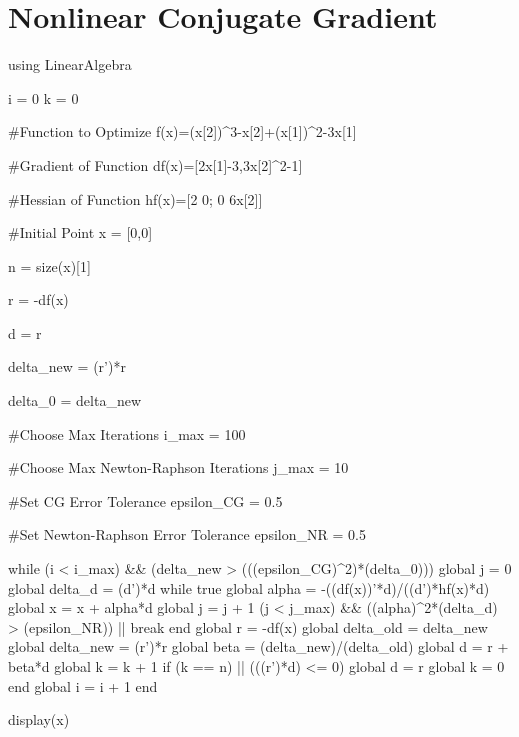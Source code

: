\section{Nonlinear Conjugate Gradient}
\begin{jllisting}
using LinearAlgebra

i = 0
k = 0

#Function to Optimize
f(x)=(x[2])^3-x[2]+(x[1])^2-3x[1]

#Gradient of Function
df(x)=[2x[1]-3,3x[2]^2-1]

#Hessian of Function
hf(x)=[2 0; 0 6x[2]]

#Initial Point
x = [0,0]

n = size(x)[1]

r = -df(x)

d = r

delta_new = (r')*r

delta_0 = delta_new

#Choose Max Iterations
i_max = 100

#Choose Max Newton-Raphson Iterations
j_max = 10

#Set CG Error Tolerance
epsilon_CG = 0.5

#Set Newton-Raphson Error Tolerance
epsilon_NR = 0.5

while (i < i_max) && (delta_new > (((epsilon_CG)^2)*(delta_0)))
	global j = 0
	global delta_d = (d')*d
	while true
		global alpha = -((df(x))'*d)/((d')*hf(x)*d)
		global x = x + alpha*d
		global j = j + 1
		(j < j_max) && ((alpha)^2*(delta_d) > (epsilon_NR)) || break
	end
	global r = -df(x)
	global delta_old = delta_new
	global delta_new = (r')*r
	global beta = (delta_new)/(delta_old)
	global d = r + beta*d
	global k = k + 1
	if (k == n) || (((r')*d) <= 0)
		global d = r
		global k = 0
	end
	global i = i + 1
end

display(x)
	
\end{jllisting}

